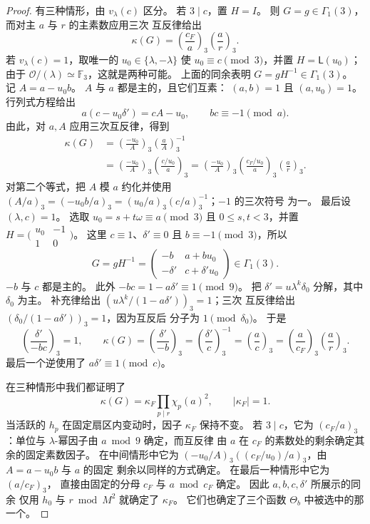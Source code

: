 \begin{proof}
有三种情形，由 $v_\lambda(c)$ 区分。
若 $3\mid c$，置 $H=I$。 则 $G=g\in\Gamma_1(3)$，而对主 $a$
与 $r$ 的主素数应用三次
互反律给出
\begin{equation}\label{eq:reflection-cusp-case-zero}
 \kappa(G)=\left(\frac{c_F}{a}\right)_3
             \left(\frac ar\right)_3.
\end{equation}
若 $v_\lambda(c)=1$，取唯一的 $u_0\in\{\lambda,-\lambda\}$
使 $u_0\equiv c\pmod3$，并置 $H=\mathsf L(u_0)$；由于
$\mathcal O/(\lambda)\simeq\mathbb F_3$，这就是两种可能。
上面的同余表明 $G=gH^{-1}\in\Gamma_1(3)$。
记 $A=a-u_0b$。 $A$ 与 $a$ 都是主的，且它们互素：
$(a,b)=1$ 且 $(a,u_0)=1$。 行列式方程给出
\[
 a(c-u_0\delta')=cA-u_0,
 \qquad bc\equiv-1\pmod a.
\]
由此，对 $a,A$ 应用三次互反律，得到
\[
 \begin{split}
 \kappa(G)
 &=\left(\frac{-u_0}{A}\right)_3
          \left(\frac aA\right)_3^{-1}\\
 &=\left(\frac{-u_0}{A}\right)_3
          \left(\frac{c/u_0}{a}\right)_3
  =\left(\frac{-u_0}{A}\right)_3
          \left(\frac{c_F/u_0}{a}\right)_3
          \left(\frac ar\right)_3.
 \end{split}
\]
对第二个等式，把 $A$ 模 $a$ 约化并使用
$(A/a)_3=(-u_0b/a)_3=(u_0/a)_3(c/a)_3^{-1}$；$-1$ 的三次符号
为一。 最后设 $(\lambda,c)=1$。 选取
$u_0=s+t\omega\equiv a\pmod3$ 且 $0\le s,t<3$，并置
$H=\bigl(\begin{smallmatrix}u_0&-1\\1&0\end{smallmatrix}\bigr)$。
这里 $c\equiv1$、$\delta'\equiv0$ 且 $b\equiv-1\pmod3$，所以
\[
 G=gH^{-1}=\begin{pmatrix}-b&a+bu_0\\-\delta'&c+\delta'u_0\end{pmatrix}
       \in\Gamma_1(3).
\]
$-b$ 与 $c$ 都是主的。 此外 $-bc=1-a\delta'\equiv1\pmod9$。
把 $\delta'=u\lambda^k\delta_0$ 分解，其中 $\delta_0$ 为主。
补充律给出 $(u\lambda^k/(1-a\delta'))_3=1$；三次
互反律给出 $(\delta_0/(1-a\delta'))_3=1$，因为互反后
分子为 $1\pmod{\delta_0}$。 于是
\[
 \left(\frac{\delta'}{-bc}\right)_3=1,
 \qquad
 \kappa(G)=\left(\frac{\delta'}{-b}\right)_3
          =\left(\frac{\delta'}c\right)_3^{-1}
          =\left(\frac ac\right)_3
          =\left(\frac a{c_F}\right)_3\left(\frac ar\right)_3.
\]
最后一个逆使用了 $a\delta'\equiv1\pmod c$。

在三种情形中我们都证明了
\begin{equation}\label{eq:reflection-multiplier}
 \kappa(G)=\kappa_F\prod_{p\mid r}\chi_p(a)^2,
 \qquad |\kappa_F|=1.
\end{equation}
当活跃的 $h_p$ 在固定扇区内变动时，因子 $\kappa_F$ 保持不变。
若 $3\mid c$，它为 $(c_F/a)_3$：单位与
$\lambda$-幂因子由 $a\bmod9$ 确定，而互反律
由 $a$ 在 $c_F$ 的素数处的剩余确定其余的固定素数因子。 在中间情形中它为
$(-u_0/A)_3((c_F/u_0)/a)_3$，由 $A=a-u_0b$ 与 $a$ 的固定
剩余以同样的方式确定。 在最后一种情形中它为 $(a/c_F)_3$，
直接由固定的分母 $c_F$ 与
$a\bmod c_F$ 确定。 因此 $a,b,c,\delta'$ 所展示的同余
仅用 $h_0$ 与 $r\bmod M^2$ 就确定了 $\kappa_F$。
它们也确定了三个函数 $\Theta_b$ 中被选中的那一个。


\end{proof}
